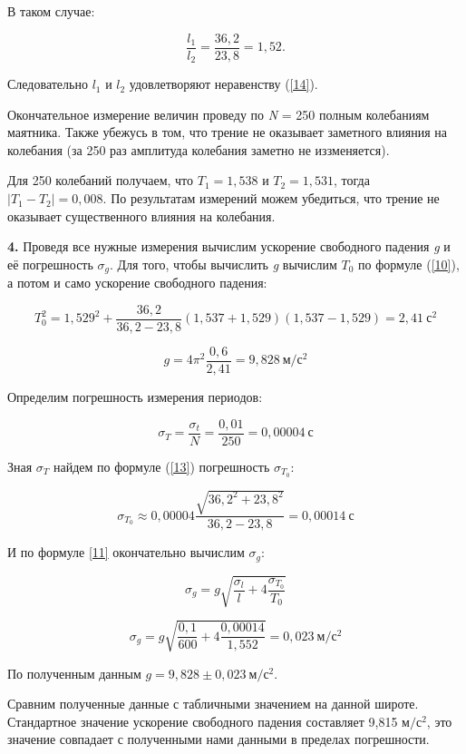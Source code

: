 \documentclass[12pt,a4paper]{article}
\begin{document}
В таком случае:

\[\frac{l_1}{l_2} = \frac{36,2}{23,8} = 1,52.\]

Следовательно $\textit{l}_1$ и $\textit{l}_2$ удовлетворяют неравенству (\ref{14}).

Окончательное измерение величин проведу по \textit{N} = 250 полным колебаниям маятника. Также убежусь в том, что трение не оказывает заметного влияния на колебания (за 250 раз амплитуда колебания заметно не иззменяется).

Для 250 колебаний получаем, что $\textit{T}_1 = 1,538$ и $\textit{T}_2 = 1,531$, тогда  $\vert\textit{T}_1 - \textit{T}_2\vert = 0,008$. По результатам измерений можем убедиться, что трение не оказывает существенного влияния на колебания.

\vspace{0,5cm}

\textbf{4.} Проведя все нужные измерения вычислим ускорение свободного падения \textit{g} и её погрешность $\sigma_g$. Для того, чтобы вычислить \textit{g} вычислим $\textit{T}_0$ по формуле (\ref{10}), а потом и само ускорение свободного падения:

\[T_0^2 = 1,529^2 +\frac{36,2}{36,2-23,8}(1,537 +1,529)(1,537 - 1,529) = 2,41\: \textit{с}^2\]

\[g = 4\pi^2\frac{0,6}{2,41} = 9,828\: \textit{м}/\textit{с}^2\]

Определим погрешность измерения периодов:

\[\sigma_T =  \frac{\sigma_t}{N} = \frac{0,01}{250} = 0,00004 \: \textit{с}\]

Зная $\sigma_T$ найдем по формуле (\ref{13}) погрешность $\sigma_{T_0}$:

\[\sigma_{T_0} \approx 0,00004\frac{\sqrt{36,2^2 + 23,8^2}}{36,2-23,8} = 0,00014\: \textit{с}\] 

И по формуле \ref{11} окончательно вычислим $\sigma_g$:

\[\sigma_g = g \sqrt{\frac{\sigma_l}{l} + 4 \frac{\sigma_{T_0}}{T_0}}\] 

\[\sigma_g = g \sqrt{\frac{0,1}{600} + 4 \frac{0,00014}{1,552}} = 0,023\: \textit{м}/\textit{с}^2\]

По полученным данным $g = 9,828\pm0,023\: \textit{м}/\textit{с}^2$.

\vspace{0,5cm}

Сравним полученные данные с табличными значением на данной широте. Стандартное значение ускорение свободного падения составляет 9,815 $\textit{м}/\textit{с}^2$, это значение совпадает с полученными нами данными в пределах погрешности.
\end{document}
